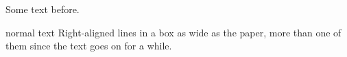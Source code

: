 \documentclass{beamer}
\begin{document}
\begin{frame}
Some text before.

\begin{beamercolorbox}[wd=\paperwidth,right,ht=1cm,dp=2pt,sep=1ex]{normal text}
Right-aligned lines in a box as wide as the paper, more than one of them since the text goes on for a while.
\end{beamercolorbox}
\end{frame}
\end{document}
